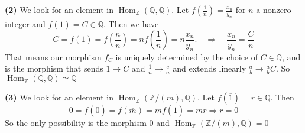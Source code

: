 \documentclass[leqno]{article}
\DeclareMathOperator{\Hom}{Hom}
\begin{document}
\textbf{(2)} We look for an element in $\Hom_{\mathbb{Z}}(\mathbb{Q}, \mathbb{Q})$. Let $f(\frac{1}{n})=\frac{x_n}{y_n}$ for $n$ a nonzero integer and $f(1)=C\in \mathbb{Q}$. Then we have 
\[
C=f(1) = f\left(\frac{n}{n}\right) = nf\left(\frac{1}{n}\right) = n \frac{x_n}{y_n}.  \quad \Rightarrow \quad
\frac{x_n}{y_n} = \frac{C}{n}
\]
That means our morphism $f_C$ is uniquely determined by the choice of  $C\in \mathbb{Q}$, and is the morphism that sends $1\to C$ and $\frac{1}{n}\to \frac{c}{n}$ and extends linearly $\frac{a}{b}\to \frac{a}{b}C$. So $\Hom_{\mathbb{Z}}(\mathbb{Q}, \mathbb{Q})\simeq \mathbb{Q}$

\textbf{(3)} We look for an element in $\Hom_{\mathbb{Z}}(\mathbb{Z} / (m), \mathbb{Q})$. Let $f(\overline{1})=r\in \mathbb{Q}$. Then 
\[0=f(\overline{0})=f(\overline{m})=mf(\overline{1})=mr \Rightarrow r=0\]
So the only possibility is the morphism $0$ and  $\Hom_{\mathbb{Z}}(\mathbb{Z} / (m), \mathbb{Q})=0$
\end{document}
